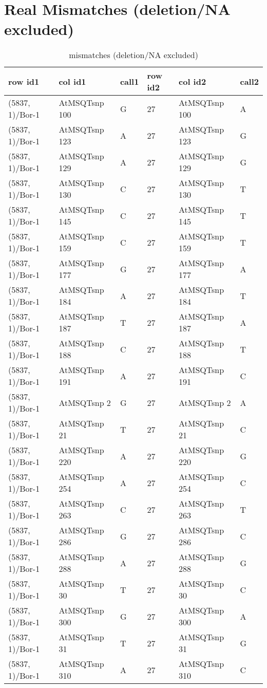 \section{Real Mismatches (deletion/NA excluded)} \label{section_real_mismatch}
\begin{center}
\begin{longtable}{|l|l|l|l|l|l|}
\caption{mismatches (deletion/NA excluded)} \label{table_dm1}\\
\hline
row id1&col id1&call1&row id2&col id2&call2\\
\hline
(5837, 1)/Bor-1&AtMSQTsnp 100&G&27&AtMSQTsnp 100&A\\
(5837, 1)/Bor-1&AtMSQTsnp 123&A&27&AtMSQTsnp 123&G\\
(5837, 1)/Bor-1&AtMSQTsnp 129&A&27&AtMSQTsnp 129&G\\
(5837, 1)/Bor-1&AtMSQTsnp 130&C&27&AtMSQTsnp 130&T\\
(5837, 1)/Bor-1&AtMSQTsnp 145&C&27&AtMSQTsnp 145&T\\
(5837, 1)/Bor-1&AtMSQTsnp 159&C&27&AtMSQTsnp 159&T\\
(5837, 1)/Bor-1&AtMSQTsnp 177&G&27&AtMSQTsnp 177&A\\
(5837, 1)/Bor-1&AtMSQTsnp 184&A&27&AtMSQTsnp 184&T\\
(5837, 1)/Bor-1&AtMSQTsnp 187&T&27&AtMSQTsnp 187&A\\
(5837, 1)/Bor-1&AtMSQTsnp 188&C&27&AtMSQTsnp 188&T\\
(5837, 1)/Bor-1&AtMSQTsnp 191&A&27&AtMSQTsnp 191&C\\
(5837, 1)/Bor-1&AtMSQTsnp 2&G&27&AtMSQTsnp 2&A\\
(5837, 1)/Bor-1&AtMSQTsnp 21&T&27&AtMSQTsnp 21&C\\
(5837, 1)/Bor-1&AtMSQTsnp 220&A&27&AtMSQTsnp 220&G\\
(5837, 1)/Bor-1&AtMSQTsnp 254&A&27&AtMSQTsnp 254&C\\
(5837, 1)/Bor-1&AtMSQTsnp 263&C&27&AtMSQTsnp 263&T\\
(5837, 1)/Bor-1&AtMSQTsnp 286&G&27&AtMSQTsnp 286&C\\
(5837, 1)/Bor-1&AtMSQTsnp 288&A&27&AtMSQTsnp 288&G\\
(5837, 1)/Bor-1&AtMSQTsnp 30&T&27&AtMSQTsnp 30&C\\
(5837, 1)/Bor-1&AtMSQTsnp 300&G&27&AtMSQTsnp 300&A\\
(5837, 1)/Bor-1&AtMSQTsnp 31&T&27&AtMSQTsnp 31&G\\
(5837, 1)/Bor-1&AtMSQTsnp 310&A&27&AtMSQTsnp 310&C\\

\end{longtable}
\end{center}
